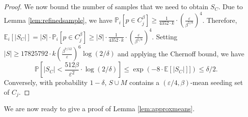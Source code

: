 \documentclass[10pt,a4paper]{amsart}
\begin{document}
\begin{proof}
We now bound the number of samples that we need to obtain $S_C$.
Due to Lemma \ref{lem:refinedsample}, we have $\mathbb{P}_i[p\in C_j^\beta]\geq \frac{1}{4352\cdot k}\cdot \left(\frac{\varepsilon}{\beta^{5/8}}\right)^4$. 
Therefore, $\mathbb{E}_i[|S_C|] = |S| \cdot \mathbb{P}_i[p\in C_j^\beta] \geq |S|\cdot \frac{1}{4352\cdot k}\cdot \left(\frac{\varepsilon}{\beta^{5/8}}\right)^4$.
Setting $|S|\geq 17825792 \cdot k\left(\frac{\beta^{7/12}}{\varepsilon}\right)^6 \log(2/\delta)$ and applying the Chernoff bound, we have
$$\mathbb{P}\left[|S_C|< \frac{512\beta}{\varepsilon^2}\cdot\log(2/\delta)\right] \leq \exp(-8 \cdot \mathbb{E}[|S_C|]]) \leq \delta/2.$$
Conversely, with probability $1-\delta$, $S\cup M$ contains a $(\varepsilon/4,\beta)$-mean seeding set of $C_j$.
\end{proof}


We are now ready to give a proof of Lemma \ref{lem:approxmeans}.
\end{document}
